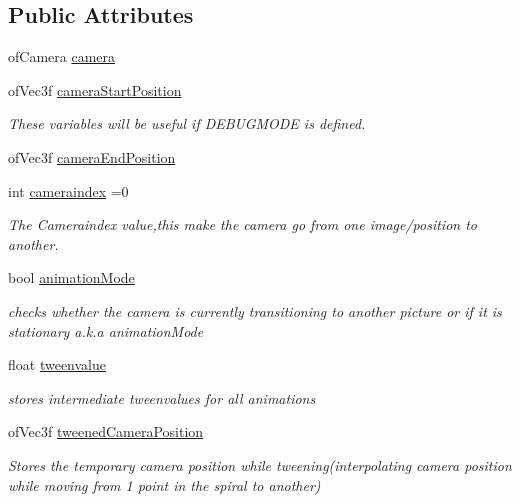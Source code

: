 \subsection*{Public Attributes}
\begin{DoxyCompactItemize}
\item 
of\-Camera \hyperlink{group___camera_ga0278ee237cbbd881252d6273b131bb55}{camera}
\item 
of\-Vec3f \hyperlink{group___camera_gac01013264b9988207e7fd9e0a486ff2f}{camera\-Start\-Position}
\begin{DoxyCompactList}\small\item\em These variables will be useful if D\-E\-B\-U\-G\-M\-O\-D\-E is defined. \end{DoxyCompactList}\item 
of\-Vec3f \hyperlink{group___camera_gad3319d9cd3cb00e898f4f602b879efad}{camera\-End\-Position}
\item 
int \hyperlink{group___camera_ga4ca3a51642dedbf37f2b9f6ef96510c7}{cameraindex} =0
\begin{DoxyCompactList}\small\item\em The Cameraindex value,this make the camera go from one image/position to another. \end{DoxyCompactList}\item 
bool \hyperlink{group___camera_ga2a5d49fd1f7f50f745f56095a1fa0099}{animation\-Mode}
\begin{DoxyCompactList}\small\item\em checks whether the camera is currently transitioning to another picture or if it is stationary a.\-k.\-a animation\-Mode \end{DoxyCompactList}\item 
float \hyperlink{group___camera_gadd9ab1aa902948afbdf1c6db0dfde385}{tweenvalue}
\begin{DoxyCompactList}\small\item\em stores intermediate tweenvalues for all animations \end{DoxyCompactList}\item 
of\-Vec3f \hyperlink{group___camera_gae9f60797c1c5d9f1ac06e1d6a5259957}{tweened\-Camera\-Position}
\begin{DoxyCompactList}\small\item\em Stores the temporary camera position while tweening(interpolating camera position while moving from 1 point in the spiral to another) \end{DoxyCompactList}\item 

\end{DoxyCompactItemize}
